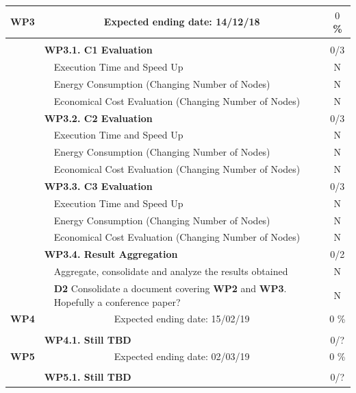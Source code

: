 \documentclass{article}
\newcommand{\lline}[1]{\hline\multicolumn{#1}{c}{}\\[-1.34em]\hline}
\begin{document}
\begin{longtable}{lm{5cm}m{7cm}c}
\textbf{WP3} & \multicolumn{2}{c}{Expected ending date: 14/12/18} & $0$ \% \\[3pt] \lline{4} %
& \multicolumn{2}{l}{\textbf{WP3.1. \textbf{C1} Evaluation}} & 0/3 \\[3pt] \hline
& & Execution Time and Speed Up & N \\[3pt]
& & Energy Consumption (Changing Number of Nodes) & N \\[3pt]
& & Economical Cost Evaluation (Changing Number of Nodes) & N \\[3pt] \hline
& \multicolumn{2}{l}{\textbf{WP3.2. \textbf{C2} Evaluation}} & 0/3 \\[3pt] \hline
& & Execution Time and Speed Up & N \\[3pt]
& & Energy Consumption (Changing Number of Nodes) & N \\[3pt]
& & Economical Cost Evaluation (Changing Number of Nodes) & N \\[3pt] \hline
& \multicolumn{2}{l}{\textbf{WP3.3. \textbf{C3} Evaluation}} & 0/3 \\[3pt] \hline
& & Execution Time and Speed Up & N \\[3pt]
& & Energy Consumption (Changing Number of Nodes) & N \\[3pt]
& & Economical Cost Evaluation (Changing Number of Nodes) & N \\[3pt] \hline
& \multicolumn{2}{l}{\textbf{WP3.4. Result Aggregation}} & 0/2 \\[3pt] \hline
& & Aggregate, consolidate and analyze the results obtained & N \\[3pt]
& & \textbf{D2} Consolidate a document covering \textbf{WP2} and \textbf{WP3}. Hopefully a conference paper? & N \\[6pt] \hline

\textbf{WP4} & \multicolumn{2}{c}{Expected ending date: 15/02/19} & $0$ \% \\[3pt] \lline{4} %
& \multicolumn{2}{l}{\textbf{WP4.1. Still TBD}} & 0/? \\[6pt] \hline

\textbf{WP5} & \multicolumn{2}{c}{Expected ending date: 02/03/19} & $0$ \% \\[3pt] \lline{4} %
& \multicolumn{2}{l}{\textbf{WP5.1. Still TBD}} & 0/? \\[6pt] \hline


\end{longtable}
\end{document}
